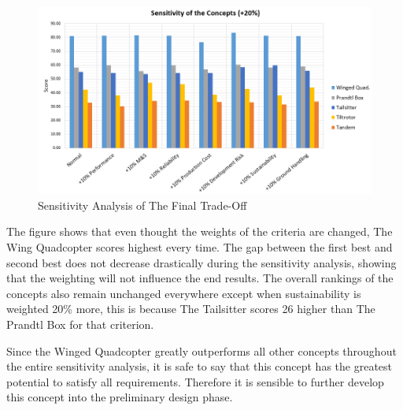 \begin{figure}[H]
    \centering
    \includegraphics[width=\textwidth]{TradeOff/Figures/sensitivity}
    \caption{Sensitivity Analysis of The Final Trade-Off}
    \label{fig:sensitivityanal}
\end{figure}

The figure shows that even thought the weights of the criteria are changed, The Wing Quadcopter scores highest every time. The gap between the first best and second best does not decrease drastically during the sensitivity analysis, showing that the weighting will not influence the end results. The overall rankings of the concepts also remain unchanged everywhere except when sustainability is weighted 20\% more, this is because The Tailsitter scores 26 higher than The Prandtl Box for that criterion.

Since the Winged Quadcopter greatly outperforms all other concepts throughout the entire sensitivity analysis, it is safe to say that this concept has the greatest potential to satisfy all requirements. Therefore it is sensible to further develop this concept into the preliminary design phase.

